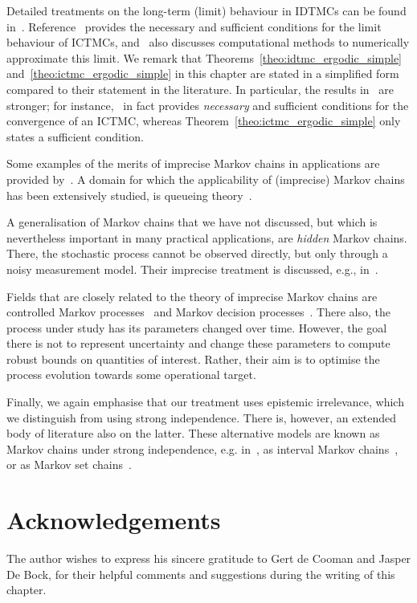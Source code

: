 \documentclass[graybox]{svmult}
\begin{document}
Detailed treatments on the long-term (limit) behaviour in IDTMCs can be found in~\cite{decooman:2009, decooman:2015, hermans:2012, skulv:2013}. Reference~\cite{DeBock:2016} provides the necessary and sufficient conditions for the limit behaviour of ICTMCs, and~\cite{erreygers2017imprecise} also discusses computational methods to numerically approximate this limit. We remark that Theorems~\ref{theo:idtmc_ergodic_simple} and~\ref{theo:ictmc_ergodic_simple} in this chapter are stated in a simplified form compared to their statement in the literature. In particular, the results in~\cite{DeBock:2016, decooman:2009} are stronger; for instance,~\cite{DeBock:2016} in fact provides \emph{necessary} and sufficient conditions for the convergence of an ICTMC, whereas Theorem~\ref{theo:ictmc_ergodic_simple} only states a sufficient condition.

Some examples of the merits of imprecise Markov chains in applications are provided by~\cite{rottondi:2017, soullard2017, troffaes2015using}. A domain for which the applicability of (imprecise) Markov chains has been extensively studied, is queueing theory~\cite{crossman:2009, lopatatzidis:2015:isipta, lopatatzidis:2015b:isipta, lopatatzidis2016queue, lopatatzidis:2017:journal}.

A generalisation of Markov chains that we have not discussed, but which is nevertheless important in many practical applications, are \emph{hidden} Markov chains. There, the stochastic process cannot be observed directly, but only through a noisy measurement model. Their imprecise treatment is discussed, e.g., in~\cite{benavoli2011,DeBock:2014ts,krak2017icthmc}.

Fields that are closely related to the theory of imprecise Markov chains are controlled Markov processes~\cite{guo:2003} and Markov decision processes~\cite{guo:2009, itoh:2007, satia:1973, white:1994}. There also, the process under study has its parameters changed over time. However, the goal there is not to represent uncertainty and change these parameters to compute robust bounds on quantities of interest. Rather, their aim is to optimise the process evolution towards some operational target.

Finally, we again emphasise that our treatment uses epistemic irrelevance, which we distinguish from using strong independence. There is, however, an extended body of literature also on the latter. These alternative models are known as Markov chains under strong independence, e.g. in~\cite{augustin2013:itip}, as interval Markov chains~\cite{galdino:2013, kozine:2002, skulj:2006, skulj:2007}, or as Markov set chains~\cite{hartfiel:1991, hartfiel:1998, hartfiel:1994}.

\section*{Acknowledgements}
The author wishes to express his sincere gratitude to Gert de Cooman and Jasper De Bock, for their helpful comments and suggestions during the writing of this chapter.


\end{document}

